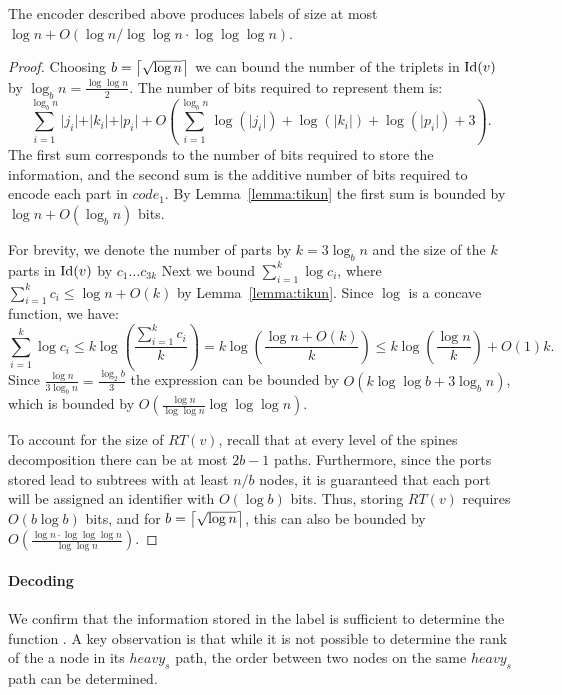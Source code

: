 \begin{lemma} \label{lemma:routingsize}
The encoder described above produces labels of size at most $\log n + O(\log n  / \log \log n \cdot \log \log \log n)$.
\end{lemma}
\begin{proof}
 Choosing $b = \left\lceil{ \sqrt{\log n } }\right\rceil$ we can bound  the number of the  triplets  in $\operatorname{Id}(v)$ by  $\log_b{n} =  \frac{\log \log n}{2}$.
 The number of bits required to represent them is:
 $$\sum_{i=1}^{\log_b n} \vert j_i \vert + \vert k_i \vert + \vert p_i \vert  +O ( \sum_{i=1}^{\log_b n} \log (\vert j_i \vert)  + \log (\vert k_i \vert)  +  \log( \vert p_i \vert ) +3  ) .$$
The first sum corresponds to  the number of bits required to store the information, and the second sum is the additive number of bits required to encode each part in $code_1$. By Lemma~\ref{lemma:tikun} the first sum is bounded by  $\log n + O(\log_b n)$ bits. 
 
For brevity, we denote the number of parts by  $k= 3 \log_b n$ and the size of the $k$ parts in $\operatorname{Id}(v)$  by $c_1 \dots c_{3{k}}$
 Next we   bound $\sum_{i=1}^{k} \log c_i$, where $\sum_{i=1}^{k}c_i \leq  \log n + O(k)$ by Lemma~\ref{lemma:tikun}.
Since $\log$ is a concave function, we have:
$$\sum_{i=1}^{k} \log c_i \leq  k \log (\frac{\sum_{i=1}^{k} c_i}{k}) = k \log (\frac{ \log n + O(k)}{k}) \leq k \log (\frac{ \log n}{k}) +O(1)k .$$
Since $\frac{\log n}{3 \log_b n}  = \frac{\log_2 b}{3}$ the expression  can be bounded by  $O( k \log \log b+ 3 \log_b n)$, which is bounded by $O(\frac{\log n}{\log \log n}\log \log \log n).$
 

To account for the size of $RT(v)$, recall that at every level of the spines decomposition there can be at most $2b-1$ paths.
Furthermore, since the ports stored lead to subtrees with at least $n/b$ nodes, it is guaranteed that each  port will be assigned an identifier with $O(\log b)$ bits. Thus, storing $RT(v)$ requires  $O( b \log b)$ bits, and  for $b = \left\lceil{\sqrt {\log n}}\right\rceil$, this can also be bounded by   $O(\frac{\log n \cdot \log \log \log n }{ \log \log n})$.
\end{proof}	 		


\paragraph{Decoding} We confirm that the information stored in the label is sufficient to determine the function \routing.
 A key observation is that while  it is not possible to  determine the rank of the a node  in its $heavy_s$ path,
 the order between two nodes on the same $heavy_s$  path can be determined.
 
